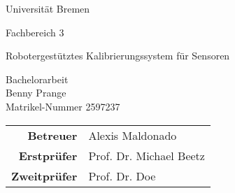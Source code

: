 
\pagestyle{empty} %

\clearscrheadings\clearscrplain
\begin{center}
\begin{Huge}
Universität Bremen\\
\vspace{3mm}
\end{Huge}
{\Large Fachbereich 3}\\

\vspace{20mm}
\begin{Large}
Robotergestütztes Kalibrierungssystem für Sensoren\\
\end{Large}
\vspace{8mm}
Bachelorarbeit\\
\vspace{0.4cm}
\vspace{2 cm}
Benny Prange \\
Matrikel-Nummer 2597237\\
\vspace{8cm}
\begin{tabular}{rl}
{\bfseries Betreuer} & Alexis Maldonado\\
{\bfseries Erstprüfer}&Prof. Dr. Michael Beetz\\
{\bfseries Zweitprüfer}&Prof. Dr. Doe\\
\end{tabular}

\end{center}
\clearpage


\pagestyle{useheadings} %

\tableofcontents %
\listoffigures %
\listoftables %
\clearpage











